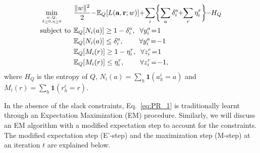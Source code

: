 \documentclass[10pt,twocolumn,letterpaper]{article}
\begin{document}
\vspace*{-7pt}
{\small
\begin{equation}\label{eq:PR_1}
\begin{aligned}
& \min \limits_{w,Q, \atop \delta \geq 0, \eta \geq 0} \hspace*{-19pt}
& \hspace*{-14pt} &  \frac{\|w \|^2}{2} \hspace*{-2pt} - \hspace*{-2pt} \mathbb{E}_Q[L(\mathbf{a}, \mathbf{r}; w)] \hspace*{-2pt} +  \hspace*{-2pt} \sum \limits_{i} \biggl\{\sum \limits_{a}  \delta_i^a \hspace*{-3pt} + \hspace*{-3pt} \sum \limits_{r}  \eta_i^r  \biggr\} \hspace*{-3pt} - \hspace*{-3pt} H_{Q}\\
& \text{subject to} \hspace*{-6pt}
& & \mathbb{E}_Q [N_i(a)] \geq 1 - \delta_i^a, \;\; \forall y_i^a \hspace*{-2pt}=\hspace*{-2pt} 1 \\
&\hspace*{-3pt}&& \mathbb{E}_Q [N_i(a)] \leq \delta_i^a, \hspace*{22pt} \forall y_i^a \hspace*{-2pt}=\hspace*{-2pt} -1 \\
&\hspace*{-3pt}&& \mathbb{E}_Q [M_i(r)] \geq 1 - \eta_i^r, \;\; \forall z_i^r \hspace*{-2pt}=\hspace*{-2pt} 1 \\
&\hspace*{-3pt}&& \mathbb{E}_Q [M_i(r)] \leq \eta_i^r, \hspace*{22pt} \forall z_i^r \hspace*{-2pt}=\hspace*{-2pt} -1,
\end{aligned}
\end{equation}} where $H_Q$ is the entropy of $Q$, $N_i(a) = \sum \limits_{h} \mathbf{1}(a_h^i=a)$ and $M_i(r) = \sum \limits_{h} \mathbf{1}(r_h^i=r)$.

In the absence of the slack constraints, Eq.~\ref{eq:PR_1} is traditionally learnt through an Expectation Maximization (EM) procedure. Similarly, we will discuss an EM algorithm with a modified expectation step to account for the constraints. The modified expectation step (E'-step) and the maximization step (M-step) at an iteration $t$ are explained below.
\end{document}
